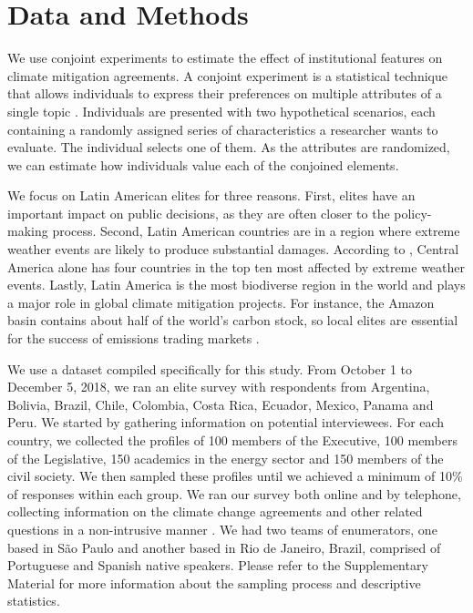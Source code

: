 \documentclass[a4paper,12pt]{article}
\begin{document}
\section{Data and Methods}%
\label{sec:data_and_methods}

We use conjoint experiments to estimate the effect of institutional features on climate mitigation agreements. A conjoint experiment is a statistical technique that allows individuals to express their preferences on multiple attributes of a single topic \citep{bansak2016economic, hainmueller2014causal}. Individuals are presented with two hypothetical scenarios, each containing a randomly assigned series of characteristics a researcher wants to evaluate. The individual selects one of them. As the attributes are randomized, we can estimate how individuals value each of the conjoined elements.

We focus on Latin American elites for three reasons. First, elites have an important impact on public decisions, as they are often closer to the policy-making process. Second, Latin American countries are in a region where extreme weather events are likely to produce substantial damages. According to \citet{eckstein2017global}, Central America alone has four countries in the top ten most affected by extreme weather events. Lastly, Latin America is the most biodiverse region in the world and plays a major role in global climate mitigation projects. For instance, the Amazon basin contains about half of the world's carbon stock, so local elites are essential for the success of emissions trading markets \citep{benitez2006site, yang2018post}. 

We use a dataset compiled specifically for this study. From October 1 to December 5, 2018, we ran an elite survey with respondents from Argentina, Bolivia, Brazil, Chile, Colombia, Costa Rica, Ecuador, Mexico, Panama and Peru. We started by gathering information on potential interviewees. For each country, we collected the profiles of 100 members of the Executive, 100 members of the Legislative, 150 academics in the energy sector and 150 members of the civil society. We then sampled these profiles until we achieved a minimum of 10\% of responses within each group. We ran our survey both online and by telephone, collecting information on the climate change agreements and other related questions in a non-intrusive manner \citep{loewen2010help}. We had two teams of enumerators, one based in S\~{a}o Paulo and another based in Rio de Janeiro, Brazil, comprised of Portuguese and Spanish native speakers. Please refer to the Supplementary Material for more information about the sampling process and descriptive statistics.
\end{document}
